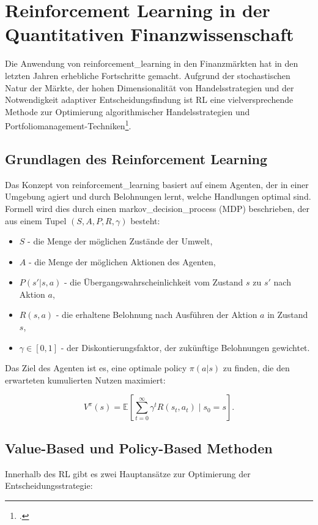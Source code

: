 \section{Reinforcement Learning in der Quantitativen Finanzwissenschaft}
\label{sec:rl_finance}

Die Anwendung von \gls{reinforcement_learning} in den Finanzmärkten hat in den letzten Jahren erhebliche Fortschritte gemacht. Aufgrund der stochastischen Natur der Märkte, der hohen Dimensionalität von Handelsstrategien und der Notwendigkeit adaptiver Entscheidungsfindung ist RL eine vielversprechende Methode zur Optimierung algorithmischer Handelsstrategien und Portfoliomanagement-Techniken\footcite{Moody1998, Dempster2006}.

\subsection{Grundlagen des Reinforcement Learning}
Das Konzept von \gls{reinforcement_learning} basiert auf einem Agenten, der in einer Umgebung agiert und durch Belohnungen lernt, welche Handlungen optimal sind. Formell wird dies durch einen \gls{markov_decision_process} (MDP) beschrieben, der aus einem Tupel \( (S, A, P, R, \gamma) \) besteht:

\begin{itemize}
	\setlength\itemsep{0.1em}
	\item \( S \) - die Menge der möglichen Zustände der Umwelt,
	\item \( A \) - die Menge der möglichen Aktionen des Agenten,
	\item \( P(s'|s,a) \) - die Übergangswahrscheinlichkeit vom Zustand \( s \) zu \( s' \) nach Aktion \( a \),
	\item \( R(s,a) \) - die erhaltene Belohnung nach Ausführen der Aktion \( a \) in Zustand \( s \),
	\item \( \gamma \in [0,1] \) - der Diskontierungsfaktor, der zukünftige Belohnungen gewichtet.
\end{itemize}

Das Ziel des Agenten ist es, eine optimale \gls{policy} \( \pi(a|s) \) zu finden, die den erwarteten kumulierten Nutzen maximiert:

\begin{equation}
	V^\pi(s) = \mathbb{E} \left[ \sum_{t=0}^{\infty} \gamma^t R(s_t, a_t) \mid s_0 = s \right].
\end{equation}

\subsection{Value-Based und Policy-Based Methoden}
Innerhalb des RL gibt es zwei Hauptansätze zur Optimierung der Entscheidungsstrategie:

